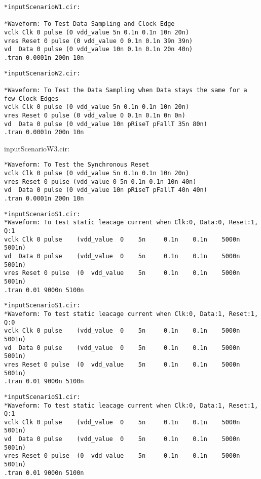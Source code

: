 \begin{lstlisting}
*inputScenarioW1.cir:

*Waveform: To Test Data Sampling and Clock Edge
vclk Clk 0 pulse (0 vdd_value 5n 0.1n 0.1n 10n 20n)     
vres Reset 0 pulse (0 vdd_value 0 0.1n 0.1n 39n 39n)       
vd  Data 0 pulse (0 vdd_value 10n 0.1n 0.1n 20n 40n)
.tran 0.0001n 200n 10n
\end{lstlisting}

\begin{lstlisting}
*inputScenarioW2.cir:

*Waveform: To Test the Data Sampling when Data stays the same for a few Clock Edges
vclk Clk 0 pulse (0 vdd_value 5n 0.1n 0.1n 10n 20n)     
vres Reset 0 pulse (0 vdd_value 0 0.1n 0.1n 0n 0n)       
vd  Data 0 pulse (0 vdd_value 10n pRiseT pFallT 35n 80n)     
.tran 0.0001n 200n 10n
\end{lstlisting}

inputScenarioW3.cir:
\begin{lstlisting}
*Waveform: To Test the Synchronous Reset
vclk Clk 0 pulse (0 vdd_value 5n 0.1n 0.1n 10n 20n)     
vres Reset 0 pulse (vdd_value 0 5n 0.1n 0.1n 10n 40n)       
vd  Data 0 pulse (0 vdd_value 10n pRiseT pFallT 40n 40n)
.tran 0.0001n 200n 10n
\end{lstlisting}

\begin{lstlisting}
*inputScenarioS1.cir:
*Waveform: To test static leacage current when Clk:0, Data:0, Reset:1, Q:1
vclk Clk 0 pulse    (vdd_value  0    5n     0.1n    0.1n    5000n     5001n)     
vd  Data 0 pulse    (vdd_value  0    5n     0.1n    0.1n    5000n     5001n)   
vres Reset 0 pulse  (0  vdd_value    5n     0.1n    0.1n    5000n     5001n)   
.tran 0.01 9000n 5100n
\end{lstlisting}

\begin{lstlisting}
*inputScenarioS1.cir:
*Waveform: To test static leacage current when Clk:0, Data:1, Reset:1, Q:0
vclk Clk 0 pulse    (vdd_value  0    5n     0.1n    0.1n    5000n     5001n)     
vd  Data 0 pulse    (vdd_value  0    5n     0.1n    0.1n    5000n     5001n)   
vres Reset 0 pulse  (0  vdd_value    5n     0.1n    0.1n    5000n     5001n)   
.tran 0.01 9000n 5100n
\end{lstlisting}

\begin{lstlisting}
*inputScenarioS1.cir:
*Waveform: To test static leacage current when Clk:0, Data:1, Reset:1, Q:1
vclk Clk 0 pulse    (vdd_value  0    5n     0.1n    0.1n    5000n     5001n)     
vd  Data 0 pulse    (vdd_value  0    5n     0.1n    0.1n    5000n     5001n)   
vres Reset 0 pulse  (0  vdd_value    5n     0.1n    0.1n    5000n     5001n)   
.tran 0.01 9000n 5100n
\end{lstlisting}

